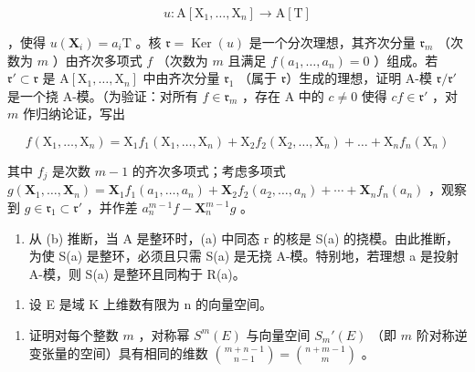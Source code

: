 \[
u: \mathrm{A} [ \mathrm{X} _ {1}, \dots , \mathrm{X} _ {n} ] \rightarrow \mathrm{A} [ \mathrm{T} ]
\]

，使得 \(u(\mathbf{X}_i) = a_i\mathrm{T}\) 。核 \(\mathfrak{r} = \operatorname{Ker}(u)\) 是一个分次理想，其齐次分量 \(\mathfrak{r}_m\) （次数为 \(m\) ）由齐次多项式 \(f\) （次数为 \(m\) 且满足 \(f(a_1, \ldots, a_n) = 0\) ）组成。若 \(\mathfrak{r}' \subset \mathfrak{r}\) 是 \(\mathrm{A}[\mathrm{X}_1, \ldots, \mathrm{X}_n]\) 中由齐次分量 \(\mathfrak{r}_1\) （属于 \(\mathfrak{r}\)）生成的理想，证明 A-模 \(\mathfrak{r}/\mathfrak{r}'\) 是一个挠 A-模。（为验证：对所有 \(f \in \mathfrak{r}_m\) ，存在 A 中的 \(c \neq 0\) 使得 \(cf \in \mathfrak{r}'\) ，对 \(m\) 作归纳论证，写出

\[
f \left(\mathrm{X} _ {1}, \dots , \mathrm{X} _ {n}\right) = \mathrm{X} _ {1} f _ {1} \left(\mathrm{X} _ {1}, \dots , \mathrm{X} _ {n}\right) + \mathrm{X} _ {2} f _ {2} \left(\mathrm{X} _ {2}, \dots , \mathrm{X} _ {n}\right) + \dots + \mathrm{X} _ {n} f _ {n} \left(\mathrm{X} _ {n}\right)
\]

其中 \(f_{j}\) 是次数 \(m - 1\) 的齐次多项式；考虑多项式 \(g(\mathbf{X}_1, \ldots, \mathbf{X}_n) = \mathbf{X}_1 f_1(a_1, \ldots, a_n) + \mathbf{X}_2 f_2(a_2, \ldots, a_n) + \cdots + \mathbf{X}_n f_n(a_n)\) ，观察到 \(g \in \mathfrak{r}_1 \subset \mathfrak{r}'\) ，并作差 \(a_n^{m-1} f - \mathbf{X}_n^{m-1} g\) 。

\begin{enumerate}
\def\labelenumi{(\alph{enumi})}
\setcounter{enumi}{2}
\tightlist
\item
  从 (b) 推断，当 A 是整环时，(a) 中同态 r 的核是 S(a) 的挠模。由此推断，为使 S(a) 是整环，必须且只需 S(a) 是无挠 A-模。特别地，若理想 a 是投射 A-模，则 S(a) 是整环且同构于 R(a)。
\end{enumerate}

\begin{enumerate}
\def\labelenumi{\arabic{enumi}.}
\setcounter{enumi}{4}
\tightlist
\item
  设 E 是域 K 上维数有限为 n 的向量空间。
\end{enumerate}

\begin{enumerate}
\def\labelenumi{(\alph{enumi})}
\tightlist
\item
  证明对每个整数 \(m\) ，对称幂 \(S^m(E)\) 与向量空间 \(S_m'(E)\) （即 \(m\) 阶对称逆变张量的空间）具有相同的维数 \(\binom{m + n - 1}{n - 1} = \binom{n + m - 1}{m}\) 。
\end{enumerate}

